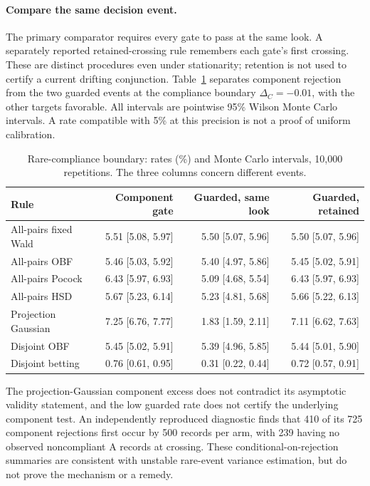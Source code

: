\paragraph{Compare the same decision event.}
The primary comparator requires every gate to pass at the same look.
A separately reported retained-crossing rule remembers each gate's
first crossing. These are distinct procedures even under stationarity;
retention is not used to certify a current drifting conjunction.
Table~\ref{tab:ustat_calibration} separates component rejection from
the two guarded events at the compliance boundary $\Delta_C=-0.01$,
with the other targets favorable. All intervals are pointwise 95\%
Wilson Monte Carlo intervals. A rate compatible with 5\% at this
precision is not a proof of uniform calibration.

\begin{table}[h]\centering\scriptsize
\caption{Rare-compliance boundary: rates (\%) and Monte Carlo intervals,
10,000 repetitions. The three columns concern different events.}
\label{tab:ustat_calibration}
\begin{tabular}{lrrr}\toprule
Rule & Component gate & Guarded, same look & Guarded, retained\\\midrule
All-pairs fixed Wald & 5.51 [5.08, 5.97] & 5.50 [5.07, 5.96] & 5.50 [5.07, 5.96] \\
All-pairs OBF & 5.46 [5.03, 5.92] & 5.40 [4.97, 5.86] & 5.45 [5.02, 5.91] \\
All-pairs Pocock & 6.43 [5.97, 6.93] & 5.09 [4.68, 5.54] & 6.43 [5.97, 6.93] \\
All-pairs HSD & 5.67 [5.23, 6.14] & 5.23 [4.81, 5.68] & 5.66 [5.22, 6.13] \\
Projection Gaussian & 7.25 [6.76, 7.77] & 1.83 [1.59, 2.11] & 7.11 [6.62, 7.63] \\
Disjoint OBF & 5.45 [5.02, 5.91] & 5.39 [4.96, 5.85] & 5.44 [5.01, 5.90] \\
Disjoint betting & 0.76 [0.61, 0.95] & 0.31 [0.22, 0.44] & 0.72 [0.57, 0.91] \\
\bottomrule\end{tabular}\end{table}

The projection-Gaussian component excess does not contradict its
asymptotic validity statement, and the low guarded rate does not certify
the underlying component test. An independently reproduced diagnostic
finds that 410 of its 725 component rejections first occur by 500 records
per arm, with 239 having no observed noncompliant A records at crossing.
These conditional-on-rejection summaries are consistent with unstable
rare-event variance estimation, but do not prove the mechanism or a remedy.

